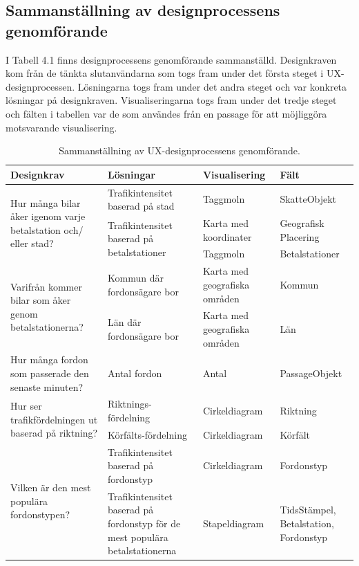 \documentclass[12pt]{kththesis}
\begin{document}
\subsection{Sammanställning av designprocessens genomförande}
I Tabell 4.1 finns designprocessens genomförande sammanställd. Designkraven kom från de tänkta slutanvändarna som togs fram under det första steget i UX-designprocessen. Lösningarna togs fram under det andra steget och var konkreta lösningar på designkraven. Visualiseringarna togs fram under det tredje steget och fälten i tabellen var de som användes från en passage för att möjliggöra motsvarande visualisering.

\begin{table}[h!]
  \begin{center}
  \caption{Sammanställning av UX-designprocessens genomförande.}
    \label{tab:table1}
 \begin{tabular}{|p{3cm}|p{3cm}|p{3cm}|p{3cm}|}
      \hline
     \textbf{Designkrav} & \textbf{Lösningar} & \textbf{Visualisering} & \textbf{Fält}\\
     \hline
  \multirow{3}{3cm}{Hur många bilar åker igenom varje betalstation och/ eller stad?} &  Trafikintensitet baserad på stad & Taggmoln  & SkatteObjekt\\\cline{2-4}
  & \multirow{2}{3cm}{Trafikintensitet baserad på betalstationer} & Karta med koordinater
& Geografisk Placering\\\cline{3-4}  
  & &  Taggmoln
& Betalstationer \\ \hline


  \multirow{2}{3cm}{Varifrån kommer bilar som åker genom betalstationerna?} &  Kommun där fordonsägare bor & Karta med geografiska områden  & Kommun\\\cline{2-4}
  &Län där fordonsägare bor
 & Karta med geografiska områden  & Län\\ \hline
 
Hur många fordon som passerade den senaste minuten? &Antal fordon
 & Antal  & PassageObjekt\\ \hline
 
 \multirow{2}{3cm}{Hur ser trafikfördelningen ut baserad på riktning?} &  Riktnings-fördelning&Cirkeldiagram& Riktning\\\cline{2-4}
  &Körfälts-fördelning 
 & Cirkeldiagram  & Körfält\\ \hline
 
 \multirow{2}{3cm}{Vilken är den mest populära fordonstypen?} &  Trafikintensitet baserad på fordonstyp & Cirkeldiagram& Fordonstyp\\\cline{2-4}
  &Trafikintensitet baserad på fordonstyp för de mest populära betalstationerna 
 & Stapeldiagram  & TidsStämpel, Betalstation, Fordonstyp\\ \hline

\end{tabular}
\end{center}
\end{table}
\end{document}
